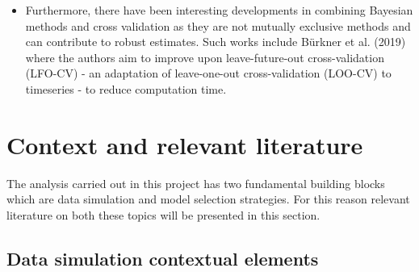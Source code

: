 \documentclass[]{article}
\providecommand{\tightlist}{%
  \setlength{\itemsep}{0pt}\setlength{\parskip}{0pt}}
\begin{document}
\begin{itemize}
\tightlist
\item
  Furthermore, there have been interesting developments in combining
  Bayesian methods and cross validation as they are not mutually
  exclusive methods and can contribute to robust estimates. Such works
  include Bürkner et al. (2019) where the authors aim to improve upon
  leave-future-out cross-validation (LFO-CV) - an adaptation of
  leave-one-out cross-validation (LOO-CV) to timeseries - to reduce
  computation time.
\end{itemize}

\hypertarget{context-and-relevant-literature}{%
\section{Context and relevant
literature}\label{context-and-relevant-literature}}

The analysis carried out in this project has two fundamental building
blocks which are data simulation and model selection strategies. For
this reason relevant literature on both these topics will be presented
in this section.

\hypertarget{data-simulation-contextual-elements}{%
\subsection{Data simulation contextual
elements}\label{data-simulation-contextual-elements}}
\end{document}
